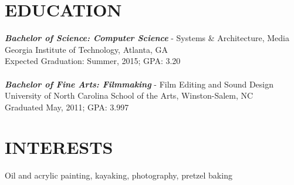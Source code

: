\documentclass[margin]{res}
\begin{document}
\begin{resume}
\section{EDUCATION} {\sl \textbf{Bachelor of Science: Computer Science}} - Systems \& Architecture, Media \\
                   Georgia Institute of Technology, Atlanta, GA\\
                   Expected Graduation: Summer, 2015; GPA: 3.20\\
                   \\
                   {\sl \textbf{Bachelor of Fine Arts: Filmmaking}} - Film Editing and Sound Design\\
                   University of North Carolina School of the Arts, Winston-Salem, NC\\
                   Graduated May, 2011; GPA: 3.997

\section{INTERESTS}  Oil and acrylic painting, kayaking, photography, pretzel baking\\


\end{resume}
\end{document}
